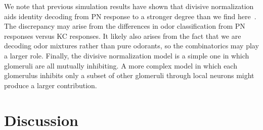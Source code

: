 \documentclass[10pt,prl,aps,showpacs,twocolumn,unsortedaddress,showkeys,linenumbers]{revtex4-1}
\begin{document}
{\color {blue} 
We note that previous simulation results have shown that divisive normalization aids identity decoding from PN response to a stronger degree than we find here~\cite{divisive_normalization}. The discrepancy may arise from the differences in odor classification from PN responses versus KC responses. It likely also arises from the fact that we are decoding odor mixtures rather than pure odorants, so the combinatorics may play a larger role. Finally, the divisive normalization model is a simple one in which glomeruli are all mutually inhibiting. A more complex model in which each glomerulus inhibits only a subset of other glomeruli through local neurons might produce a larger contribution.
}

















\section*{Discussion}

\end{document}
